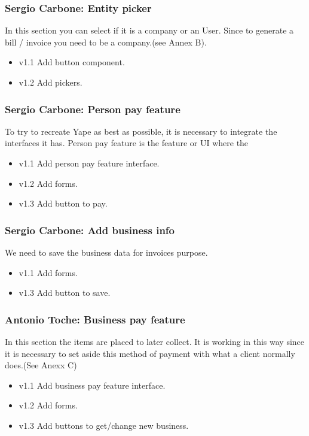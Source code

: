 \documentclass{article}
\begin{document}
\subsubsection{Sergio Carbone: Entity picker}
In this section you can select if it is a company or an User. Since to generate a bill / invoice you need to be a company.(see Annex B).
\begin{itemize}
\item v1.1 Add button component.
\item v1.2 Add pickers.
\end{itemize}

\subsubsection{Sergio Carbone: Person pay feature}
To try to recreate Yape as best as possible, it is necessary to integrate the interfaces it has. Person pay feature is the feature or UI where the 
\begin{itemize}
\item v1.1 Add person pay feature interface.
\item v1.2 Add forms.
\item v1.3 Add button to pay.
\end{itemize}

\subsubsection{Sergio Carbone: Add business info}
We need to save the business data for invoices purpose.
\begin{itemize}
\item v1.1 Add forms.
\item v1.3 Add button to save.
\end{itemize}

\subsubsection{Antonio Toche: Business pay feature}
In this section the items are placed to later collect. It is working in this way since it is necessary to set aside this method of payment with what a client normally does.(See Anexx C)
\begin{itemize}
\item v1.1 Add business pay feature interface.
\item v1.2 Add forms.
\item v1.3 Add buttons to get/change new business.
\end{itemize}
\end{document}
